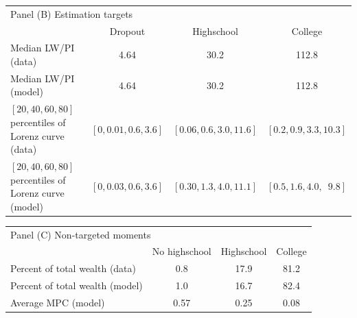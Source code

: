 \documentclass[11pt]{article}
\begin{document}
\begin{table}[th]
\begin{center}
	\begin{tabular}{lccc}
	\multicolumn{4}{l}{Panel (B) Estimation targets} \\ 
	& Dropout & Highschool & College \\ \midrule
	Median LW/PI (data) & 4.64 & 30.2 & 112.8 \\ 
	Median LW/PI (model) & 4.64 & 30.2 & 112.8 \\
	 $[20,40,60,80]$ percentiles of Lorenz curve (data) & $[0, 0.01, 0.6, 3.6]$ & $[0.06, 0.6, 3.0, 11.6]$ & $[0.2, 0.9, 3.3, 10.3]$ \\
	$[20,40,60,80]$ percentiles of Lorenz curve (model) & $[0, 0.03, 0.6, 3.6]$ & $[0.30, 1.3, 4.0, 11.1]$ & $[0.5, 1.6, 4.0, \phantom{0}9.8]$
	\\ \bottomrule 
	\end{tabular}
\end{center}
\end{table}

\begin{table}[th]
\begin{center}		
	\begin{tabular}{lccc}
	\multicolumn{4}{l}{Panel (C) Non-targeted moments} \\ 
	& No highschool & Highschool & College \\ \midrule
	Percent of total wealth (data) & 0.8 & 17.9 & 81.2 \\
	Percent of total wealth (model) & 1.0 & 16.7 & 82.4 \\
	Average MPC (model) & 0.57 & 0.25 & 0.08 
	\\ \bottomrule 
	\end{tabular}
\end{center}
\end{table}
	
	
\end{document}
